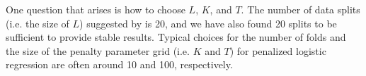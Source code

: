 One question that arises is how to choose $L$, $K$, and $T$.  The number of data
splits (i.e. the size of $L$) suggested by \cite{fan2016} is 20, and we have
also found 20 splits to be sufficient to provide stable results.  Typical
choices for the number of folds and the size of the penalty parameter grid
(i.e. $K$ and $T$) for penalized logistic regression are often around 10 and
100, respectively.






